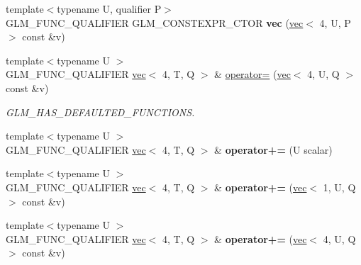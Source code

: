\begin{DoxyCompactItemize}
\item 
\mbox{\label{structglm_1_1vec_3_014_00_01T_00_01Q_01_4_a057f137a7b9cd18c6277dd4bc7f90335}} 
{\footnotesize template$<$typename U, qualifier P$>$ }\\G\+L\+M\+\_\+\+F\+U\+N\+C\+\_\+\+Q\+U\+A\+L\+I\+F\+I\+ER G\+L\+M\+\_\+\+C\+O\+N\+S\+T\+E\+X\+P\+R\+\_\+\+C\+T\+OR {\bfseries vec} (\hyperlink{structglm_1_1vec}{vec}$<$ 4, U, P $>$ const \&v)
\item 
\mbox{\label{structglm_1_1vec_3_014_00_01T_00_01Q_01_4_a344768c77d8e86a2e6cc25bf56668a01}} 
{\footnotesize template$<$typename U $>$ }\\G\+L\+M\+\_\+\+F\+U\+N\+C\+\_\+\+Q\+U\+A\+L\+I\+F\+I\+ER \hyperlink{structglm_1_1vec}{vec}$<$ 4, T, Q $>$ \& \hyperlink{structglm_1_1vec_3_014_00_01T_00_01Q_01_4_a344768c77d8e86a2e6cc25bf56668a01}{operator=} (\hyperlink{structglm_1_1vec}{vec}$<$ 4, U, Q $>$ const \&v)
\begin{DoxyCompactList}\small\item\em G\+L\+M\+\_\+\+H\+A\+S\+\_\+\+D\+E\+F\+A\+U\+L\+T\+E\+D\+\_\+\+F\+U\+N\+C\+T\+I\+O\+NS. \end{DoxyCompactList}\item 
\mbox{\label{structglm_1_1vec_3_014_00_01T_00_01Q_01_4_a96606ae109d8037bfb8ff43c40b25609}} 
{\footnotesize template$<$typename U $>$ }\\G\+L\+M\+\_\+\+F\+U\+N\+C\+\_\+\+Q\+U\+A\+L\+I\+F\+I\+ER \hyperlink{structglm_1_1vec}{vec}$<$ 4, T, Q $>$ \& {\bfseries operator+=} (U scalar)
\item 
\mbox{\label{structglm_1_1vec_3_014_00_01T_00_01Q_01_4_af625138d4bb7efba666576ceef07eb17}} 
{\footnotesize template$<$typename U $>$ }\\G\+L\+M\+\_\+\+F\+U\+N\+C\+\_\+\+Q\+U\+A\+L\+I\+F\+I\+ER \hyperlink{structglm_1_1vec}{vec}$<$ 4, T, Q $>$ \& {\bfseries operator+=} (\hyperlink{structglm_1_1vec}{vec}$<$ 1, U, Q $>$ const \&v)
\item 
\mbox{\label{structglm_1_1vec_3_014_00_01T_00_01Q_01_4_a39b0ffcd7cb03511bb234d52860f5ce8}} 
{\footnotesize template$<$typename U $>$ }\\G\+L\+M\+\_\+\+F\+U\+N\+C\+\_\+\+Q\+U\+A\+L\+I\+F\+I\+ER \hyperlink{structglm_1_1vec}{vec}$<$ 4, T, Q $>$ \& {\bfseries operator+=} (\hyperlink{structglm_1_1vec}{vec}$<$ 4, U, Q $>$ const \&v)

\end{DoxyCompactItemize}
